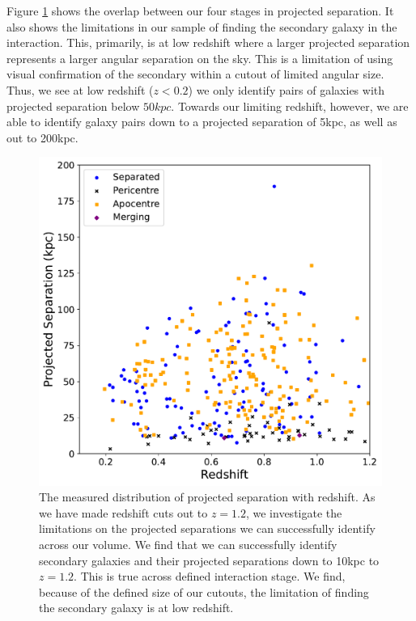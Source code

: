 Figure \ref{fig:proj-seps-limits} shows the overlap between our four stages in projected separation. It also shows the limitations in our sample of finding the secondary galaxy in the interaction. This, primarily, is at low redshift where a larger projected separation represents a larger angular separation on the sky. This is a limitation of using visual confirmation of the secondary within a cutout of limited angular size. Thus, we see at low redshift ($z < 0.2$) we only identify pairs of galaxies with projected separation below $50kpc$. Towards our limiting redshift, however, we are able to identify galaxy pairs down to a projected separation of 5kpc, as well as out to 200kpc. 

\begin{figure}
    \centering
    \includegraphics[width=\textwidth]{Chapter3/figures/redshift-proj-sep-diagnostic.pdf}
    \caption[]{The measured distribution of projected separation with redshift. As we have made redshift cuts out to $z = 1.2$, we investigate the limitations on the projected separations we can successfully identify across our volume. We find that we can successfully identify secondary galaxies and their projected separations down to 10kpc to $z=1.2$. This is true across defined interaction stage. We find, because of the defined size of our cutouts, the limitation of finding the secondary galaxy is at low redshift.}
    \label{fig:proj-seps-limits}
\end{figure}

